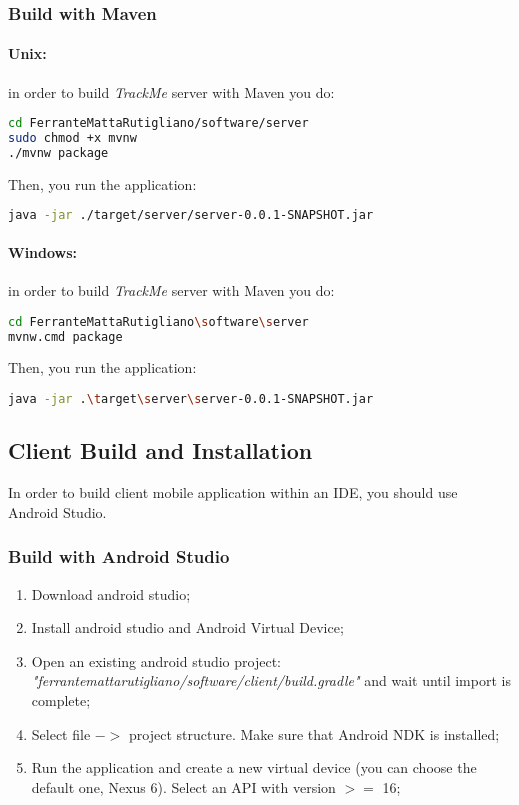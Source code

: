 \documentclass[a4paper]{article}
\begin{document}
\subsubsection{Build with Maven}

\paragraph{Unix:} in order to build \textit{TrackMe} server with Maven you do:

\begin{lstlisting}[language=bash]
cd FerranteMattaRutigliano/software/server
sudo chmod +x mvnw
./mvnw package
\end{lstlisting}

Then, you run the application:

\begin{lstlisting}[language=bash]
java -jar ./target/server/server-0.0.1-SNAPSHOT.jar
\end{lstlisting}

\paragraph{Windows:} in order to build \textit{TrackMe} server with Maven you do:

\begin{lstlisting}[language=bash]
cd FerranteMattaRutigliano\software\server
mvnw.cmd package
\end{lstlisting}

Then, you run the application:

\begin{lstlisting}[language=bash]
java -jar .\target\server\server-0.0.1-SNAPSHOT.jar
\end{lstlisting}

\subsection{Client Build and Installation}
In order to build client mobile application within an IDE, you should use Android Studio.

\subsubsection{Build with Android Studio}
\begin{enumerate}
    \item Download android studio;
    \item Install android studio and Android Virtual Device;
    \item Open an existing android studio project:
    \newline\textit{"ferrantemattarutigliano/software/client/build.gradle"} and wait until import is complete;
    \item Select file ${->}$ project structure. Make sure that Android NDK is installed;
    \item Run the application and create a new virtual device (you can choose the default one, Nexus 6). Select an API with version ${>=}$ 16;
\end{enumerate}
\end{document}
